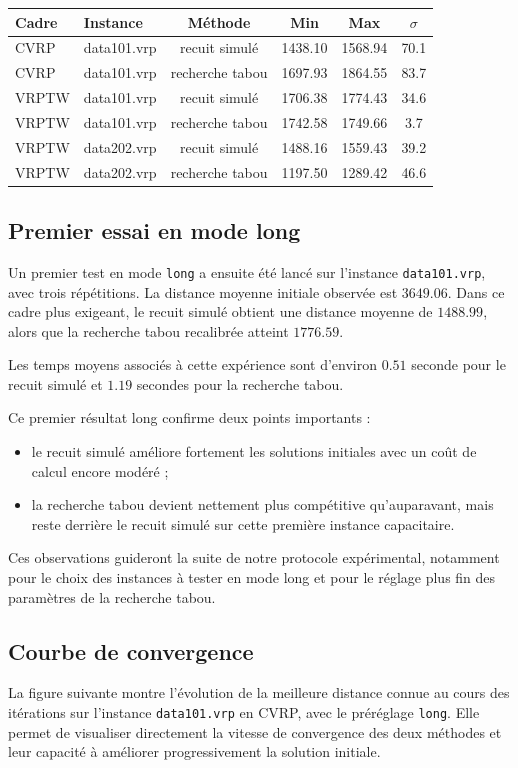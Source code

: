 \documentclass[11pt,a4paper]{article}
\begin{document}
\begin{center}
\begin{tabular}{llcccc}
\toprule
Cadre & Instance & Méthode & Min & Max & \(\sigma\) \\
\midrule
CVRP  & data101.vrp & recuit simulé   & 1438.10 & 1568.94 & 70.1 \\
CVRP  & data101.vrp & recherche tabou & 1697.93 & 1864.55 & 83.7 \\
VRPTW & data101.vrp & recuit simulé   & 1706.38 & 1774.43 & 34.6 \\
VRPTW & data101.vrp & recherche tabou & 1742.58 & 1749.66 &  3.7 \\
VRPTW & data202.vrp & recuit simulé   & 1488.16 & 1559.43 & 39.2 \\
VRPTW & data202.vrp & recherche tabou & 1197.50 & 1289.42 & 46.6 \\
\bottomrule
\end{tabular}
\end{center}

\subsection{Premier essai en mode long}
Un premier test en mode \texttt{long} a ensuite été lancé sur l'instance \texttt{data101.vrp}, avec trois répétitions. La distance moyenne initiale observée est \(3649.06\). Dans ce cadre plus exigeant, le recuit simulé obtient une distance moyenne de \(1488.99\), alors que la recherche tabou recalibrée atteint \(1776.59\).

Les temps moyens associés à cette expérience sont d'environ \(0.51\) seconde pour le recuit simulé et \(1.19\) secondes pour la recherche tabou.

Ce premier résultat long confirme deux points importants :
\begin{itemize}
    \item le recuit simulé améliore fortement les solutions initiales avec un coût de calcul encore modéré ;
    \item la recherche tabou devient nettement plus compétitive qu'auparavant, mais reste derrière le recuit simulé sur cette première instance capacitaire.
\end{itemize}

Ces observations guideront la suite de notre protocole expérimental, notamment pour le choix des instances à tester en mode long et pour le réglage plus fin des paramètres de la recherche tabou.

\subsection{Courbe de convergence}
La figure suivante montre l'évolution de la meilleure distance connue au cours des itérations sur l'instance \texttt{data101.vrp} en CVRP, avec le préréglage \texttt{long}. Elle permet de visualiser directement la vitesse de convergence des deux méthodes et leur capacité à améliorer progressivement la solution initiale.
\end{document}
